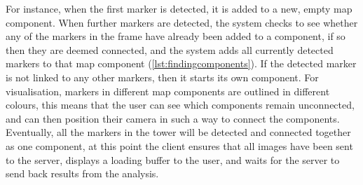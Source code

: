 For instance, when the first marker is detected, it is added to a new, empty map component. When further markers are detected, the system checks to see whether any of the markers in the frame have already been added to a component, if so then they are deemed connected, and the system adds all currently detected markers to that map component (\cref{lst:findingcomponents}). If the detected marker is not linked to any other markers, then it starts its own component. For visualisation, markers in different map components are outlined in different colours, this means that the user can see which components remain unconnected, and can then position their camera in such a way to connect the components. Eventually, all the markers in the tower will be detected and connected together as one component, at this point the client ensures that all images have been sent to the server, displays a loading buffer to the user, and waits for the server to send back results from the analysis.




